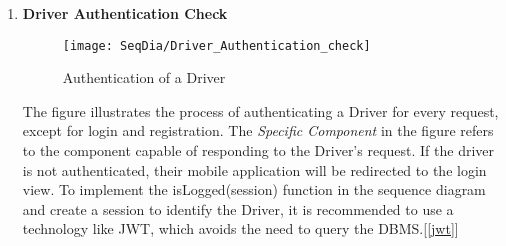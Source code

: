 \begin{enumerate}
    
    \item \textbf{Driver Authentication Check}
        \begin{figure}[H]
            \begin{center}
            \texttt{[image: SeqDia/Driver\_Authentication\_check]}
            \caption{Authentication of a Driver}
            \label{fig:DriverAuth}
            \end{center}
        \end{figure}
        The figure illustrates the process of authenticating a Driver for every request, except for login and registration. The \textit{Specific Component} in the figure refers to the component capable of responding to the Driver's request. If the driver is not authenticated, their mobile application will be redirected to the login view. To implement the isLogged(session) function in the sequence diagram and create a session to identify the Driver, it is recommended to use a technology like JWT, which avoids the need to query the DBMS.[\ref{jwt}]\\
        

\end{enumerate}
